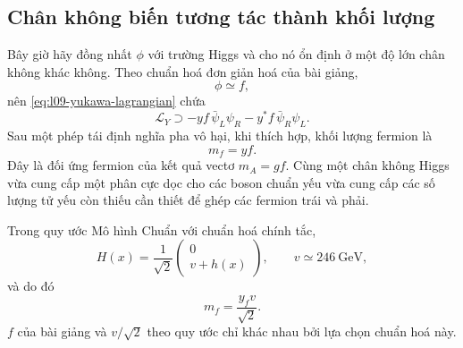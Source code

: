 \begin{classroomqa}
\end{classroomqa}

\subsection{Chân không biến tương tác thành khối lượng}

Bây giờ hãy đồng nhất \(\phi\) với trường Higgs và cho nó ổn định ở một độ lớn chân không khác không. Theo chuẩn hoá đơn giản hoá của bài giảng,
\begin{equation}
  \phi\simeq f,
\end{equation}
nên \eqref{eq:l09-yukawa-lagrangian} chứa
\begin{equation}
  \mathcal L_Y
  \supset
  -yf\,\bar\psi_L\psi_R
  -y^*f\,\bar\psi_R\psi_L .
\end{equation}
Sau một phép tái định nghĩa pha vô hại, khi thích hợp, khối lượng fermion là
\begin{equation}
  m_f=yf.
  \label{eq:l09-lecture-fermion-mass}
\end{equation}
Đây là đối ứng fermion của kết quả vectơ \(m_A=gf\). Cùng một chân không Higgs vừa cung cấp một phân cực dọc cho các boson chuẩn yếu vừa cung cấp các số lượng tử yếu còn thiếu cần thiết để ghép các fermion trái và phải.

Trong quy ước Mô hình Chuẩn với chuẩn hoá chính tắc,
\begin{equation}
  H(x)=\frac1{\sqrt2}
  \begin{pmatrix}
    0\\ v+h(x)
  \end{pmatrix},
  \qquad v\simeq246\ \mathrm{GeV},
  \label{eq:l09-sm-higgs-vacuum}
\end{equation}
và do đó
\begin{equation}
  m_f=\frac{y_fv}{\sqrt2}.
  \label{eq:l09-sm-fermion-mass}
\end{equation}
\(f\) của bài giảng và \(v/\sqrt2\) theo quy ước chỉ khác nhau bởi lựa chọn chuẩn hoá này.

\begin{classroomqa}
\end{classroomqa}

